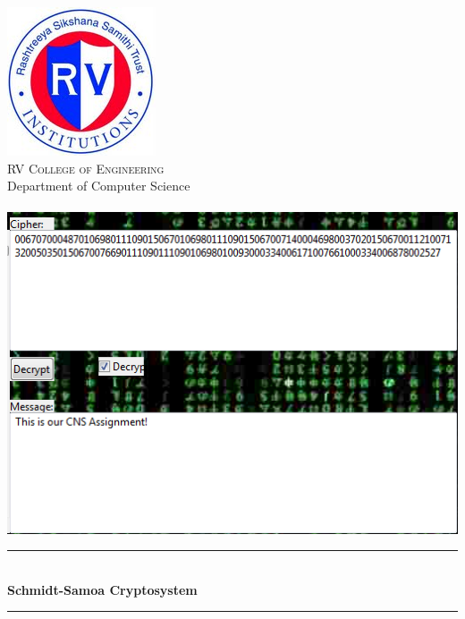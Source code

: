 \documentclass[12pt]{article} %
\newcommand{\HRule}{\rule{\linewidth}{0.5mm}}
\begin{document}
\maketitle

\begin{titlepage}

\begin{center}


\includegraphics[scale=0.75]{RVCE.png}\\[1cm]    

\textsc{\LARGE  RV College of Engineering}\\[0.5cm]
\large{Department of Computer Science}\\[1cm]
\textsc{\Large }\\[0.5cm]

\includegraphics[scale=1]{proj.png}\\[1cm]    

\HRule \\[0.4cm]
{  \huge\bfseries Schmidt-Samoa Cryptosystem }\\[0.4cm]

\HRule \\[1cm]


\end{center}
\end{titlepage}
\end{document}

